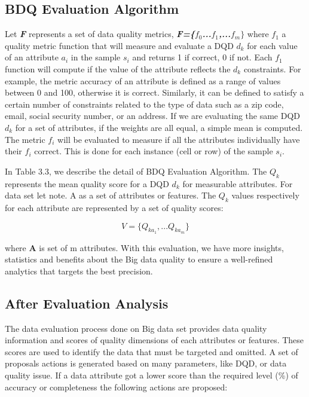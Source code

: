 \subsection{BDQ Evaluation Algorithm}

Let \textbf{\textit{F}} represents a set of data quality metrics, \textbf{\textit{F=\{$f_0$...$f_1$,...$f_m\}$}} 
where \textit{$f_1$} a quality metric function that will measure and evaluate a DQD \textbf{$d_k$}
for each value of an attribute $a_i$ in the sample $s_i$ and returns 1 if correct, 0 if not. 
Each $f_1$ function will compute if the value of the attribute reflects the $d_k$ constraints. 
For example, the metric accuracy of an attribute is defined as a range of values between 0 and 100,
otherwise it is correct. Similarly, it can be defined to satisfy a certain number of constraints
related to the type of data such as a zip code, email, social security number, or an address. 
If we are evaluating the same DQD $d_k$ for a set of attributes, if the weights are all equal, a simple mean 
is computed. The metric $f_i$ will be evaluated to measure if all the attributes individually 
have their $f_i$ correct. This is done for each instance (cell or row) of the sample $s_i$.

In Table 3.3, we describe the detail of BDQ Evaluation Algorithm. The $Q_k$ represents the mean
quality score for a DQD $d_k$ for measurable attributes. For data set let note. 
A as a set of attributes or features. The $Q_k$ values respectively for each attribute are represented
by a set of quality scores: 

\begin{equation*}
	V = \{Q_{ka_1},... Q_{ka_m} \}
\end{equation*}

where \textbf{A} is set of m attributes. With this evaluation, we have more insights, statistics and benefits 
about the Big data quality to ensure a well-refined analytics that targets the best precision.

\subsection{After Evaluation Analysis}

The data evaluation process done on Big data set provides
data quality information and scores of quality dimensions of
each attributes or features. These scores are used to identify
the data that must be targeted and omitted. A set of
proposals actions is generated based on many parameters,
like DQD, or data quality issue. If a data attribute got a lower score than the required level (\%) of accuracy or completeness the following actions are proposed:

